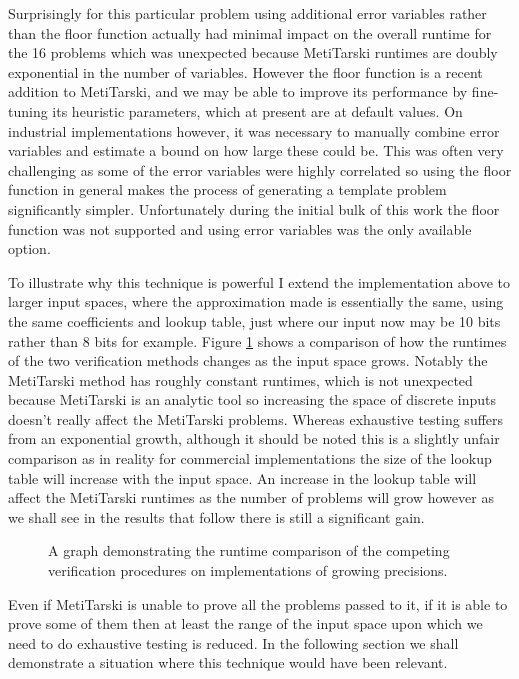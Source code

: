 \documentclass[a4]{article}
\begin{document}
Surprisingly for this particular problem using additional error variables rather than the floor function actually had minimal impact on the overall runtime for the 16 problems which was unexpected because MetiTarski runtimes are doubly exponential in the number of variables. However the floor function is a recent addition to MetiTarski, and we may be able to improve its performance by fine-tuning its heuristic parameters, which at present are at default values. On industrial implementations however, it was necessary to manually combine error variables and estimate a bound on how large these could be. This was often very challenging as some of the error variables were highly correlated so using the floor function in general makes the process of generating a template problem significantly simpler. Unfortunately during the initial bulk of this work the floor function was not supported and using error variables was the only available option.

To illustrate why this technique is powerful I extend the implementation above to larger input spaces, where the approximation made is essentially the same, using the same coefficients and lookup table, just where our input now may be 10 bits rather than 8 bits for example. Figure \ref{runtime_graph} shows a comparison of how the runtimes of the two verification methods changes as the input space grows. Notably the MetiTarski method has roughly constant runtimes, which is not unexpected because MetiTarski is an analytic tool so increasing the space of discrete inputs doesn't really affect the MetiTarski problems. Whereas exhaustive testing suffers from an exponential growth, although it should be noted this is a slightly unfair comparison as in reality for commercial implementations the size of the lookup table will increase with the input space. An increase in the lookup table will affect the MetiTarski runtimes as the number of problems will grow however as we shall see in the results that follow there is still a significant gain.
\begin{figure}
\centering

\caption{A graph demonstrating the runtime comparison of the competing verification procedures on implementations of growing precisions. \label{runtime_graph}
}
\end{figure}
Even if MetiTarski is unable to prove all the problems passed to it, if it is able to prove some of them then at least the range of the input space upon which we need to do exhaustive testing is reduced. In the following section we shall demonstrate a situation where this technique would have been relevant. 
\end{document}
